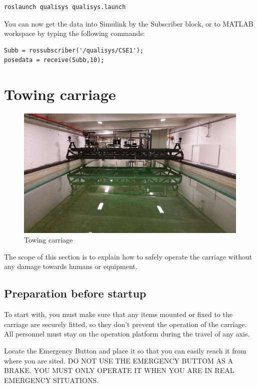 \documentclass[a4paper,twoside,english]{report}
\begin{document}
\begin{verbatim}roslaunch qualisys qualisys.launch\end{verbatim}

You can now get the data into Simulink by the Subscriber block, or
to MATLAB workspace by typing the following commands:

\begin{verbatim}Subb = rossubscriber('/qualisys/CSE1');
posedata = receive(Subb,10);\end{verbatim}

\clearpage{}

\chapter{Towing carriage}

\begin{figure}
\centering \includegraphics[width=1\textwidth]{fig/towing_carriage}
\caption{\label{fig: Towing carriage}Towing carriage}
\end{figure}

The scope of this section is to explain how to safely operate the
carriage without any damage towards humans or equipment. 

\section{Preparation before startup}

To start with, you must make sure that any items mounted or fixed
to the carriage are securely fitted, so they don't prevent the operation
of the carriage. All personnel must stay on the operation platform
during the travel of any axis.

Locate the Emergency Button and place it so that you can easily reach
it from where you are sited. DO NOT USE THE EMERGENCY BUTTOM AS A
BRAKE. YOU MUST ONLY OPERATE IT WHEN YOU ARE IN REAL EMERGENCY SITUATIONS.
\end{document}
